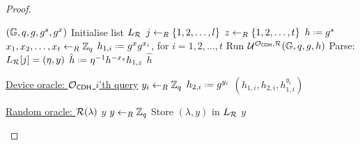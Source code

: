 \begin{proof}
\begin{Algorithm}[]{6cm}
\captionAdversary
\caption{$\adve$}
\label{alg:CDHadve1}
\begin{algorithmic}[1]
\Require $(\mathbb{G},q,g,g^s,g^x)$ 
\State Initialise list $L_{\operatorname{\mathcal{R}}}$
\State $j\leftarrow_R\{1,2,\ldots,l\}$
\State $z\leftarrow_R\{1,2,\ldots,t\}$
\State $h \defeq g^s$
\State $x_1,x_2,\ldots,x_t\leftarrow_R\mathbb{Z}_q$
\State $h_{1,i} \defeq g^xg^{x_i}$, for $i = 1, 2, \ldots, t$
\State Run $\mathcal{U}^{\operatorname{\mathcal{O}}_{\mathsf{CDH}},\operatorname{\mathcal{R}}}(\mathbb{G},q,g,h)$
\State Parse: $L_{\operatorname{\mathcal{R}}}[j] = (\eta,y)$
\State $\hat{h} \defeq \eta^{-1}h^{-x_z}h_{1,z}$
\State \Ret $\hat{h}$
\Statex\hrulefill
\end{algorithmic}
\begin{algorithmic}[1]
\Statex \underline{Device oracle: \textbf{$\operatorname{\mathcal{O}}_{\mathsf{CDH}}$} $i$'th query}
\Statex
\State $y_i\leftarrow_R\mathbb{Z}_q$
\State $h_{2,i} \defeq g^{y_i}$
\State \Ret $(h_{1,i},h_{2,i},h_{1,i}^{y_i})$
\end{algorithmic}
\begin{algorithmic}[1]
\Statex \underline{Random oracle: \textbf{$\operatorname{\mathcal{R}}(\lambda)$}}
\Statex
{}
\State \Ret $y$
\Else
\State $y\leftarrow_R \mathbb{Z}_q$
\State Store $(\lambda,y)$ in $L_{\operatorname{\mathcal{R}}}$
\State \Ret $y$
\EndIf
\end{algorithmic}
\end{Algorithm}


\end{proof}
